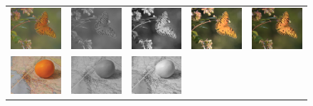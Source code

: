 \begin{figure}[t]
\begin{center}
\begin{tabular}{ccccc}
\includegraphics[width=0.18\linewidth]{fig/i02.png} &
\includegraphics[width=0.18\linewidth]{fig/i02-rgb2gray.png} &
\includegraphics[width=0.18\linewidth]{fig/i02-sparse_dr.png} &
\includegraphics[width=0.18\linewidth]{fig/i02-enhance.png} &
\includegraphics[width=0.18\linewidth]{fig/i02-iccp2012.png} \\
\includegraphics[width=0.18\linewidth]{fig/i04.png} &
\includegraphics[width=0.18\linewidth]{fig/i04-rgb2gray.png} &
\includegraphics[width=0.18\linewidth]{fig/i04-sparse_dr.png} &

\end{tabular}
\end{center}
\end{figure}

